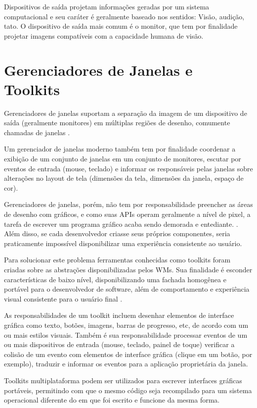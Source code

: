 Dispositivos de saída projetam informações geradas por um sistema computacional
e seu caráter é geralmente baseado nos sentidos: Visão, audição, tato. O
dispositivo de saída mais comum é o monitor, que tem por finalidade projetar
imagens compatíveis com a capacidade humana de visão.

\section{Gerenciadores de Janelas e Toolkits}

Gerenciadores de janelas suportam a separação da imagem de um dispositivo de
saída (geralmente monitores) em múltiplas regiões de desenho, comumente chamadas
de janelas  \cite[p. 5]{myers1996uimss}.

Um gerenciador de janelas moderno também tem por finalidade coordenar a exibição
de um conjunto de janelas em um conjunto de monitores, escutar por eventos de
entrada (mouse, teclado) e informar os responsáveis pelas janelas sobre
alterações no layout de tela (dimensões da tela, dimensões da janela, espaço de
cor).

Gerenciadores de janelas, porém, não tem por responsabilidade preencher as áreas
de desenho com gráficos, e como suas APIs operam geralmente a nível de pixel, a
tarefa de escrever um programa gráfico acaba sendo demorada e entediante.
. Além disso, se cada
desenvolvedor criasse seus próprios componentes, seria praticamente impossível
disponibilizar uma experiência consistente ao usuário.

Para solucionar este problema ferramentas conhecidas como toolkits foram criadas
sobre as abstrações disponibilizadas pelos WMs. Sua finalidade é esconder
características de baixo nível, disponibilizando uma fachada homogênea e
portável para o desenvolvedor de software, além de comportamento e experiência
visual consistente para o usuário final \cite{myers2000past}.

As responsabilidades de um toolkit incluem desenhar elementos de interface
gráfica como texto, botões, imagens, barras de progresso, etc, de acordo com um
ou mais estilos visuais. Também é sua responsabilidade processar eventos de um
ou mais dispositivos de entrada (mouse, teclado, painel de toque) verificar a
colisão de um evento com elementos de interface gráfica (clique em um botão, por
exemplo), traduzir e informar os eventos para a aplicação proprietária da
janela.

Toolkits multiplataforma podem ser utilizados para escrever interfaces gráficas
portáveis, permitindo com que o mesmo código seja recompilado para um sistema
operacional diferente do em que foi escrito e funcione da mesma forma.

